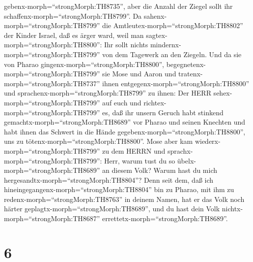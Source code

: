 gebenx-morph=``strongMorph:TH8735'', aber die Anzahl der Ziegel sollt
ihr schaffenx-morph=``strongMorph:TH8799''.  Da
sahenx-morph=``strongMorph:TH8799'' die
Amtleutex-morph=``strongMorph:TH8802'' der Kinder Israel, daß es ärger
ward, weil man sagtex-morph=``strongMorph:TH8800'': Ihr sollt nichts
mindernx-morph=``strongMorph:TH8799'' von dem Tagewerk an den Ziegeln.
 Und da sie von Pharao
gingenx-morph=``strongMorph:TH8800'',
begegnetenx-morph=``strongMorph:TH8799'' sie Mose und Aaron und
tratenx-morph=``strongMorph:TH8737'' ihnen
entgegenx-morph=``strongMorph:TH8800''  und
sprachenx-morph=``strongMorph:TH8799'' zu ihnen: Der HERR
sehex-morph=``strongMorph:TH8799'' auf euch und
richtex-morph=``strongMorph:TH8799'' es, daß ihr unsern Geruch habt
stinkend gemachtx-morph=``strongMorph:TH8689'' vor Pharao und seinen
Knechten und habt ihnen das Schwert in die Hände
gegebenx-morph=``strongMorph:TH8800'', uns zu
tötenx-morph=``strongMorph:TH8800''.  Mose aber kam
wiederx-morph=``strongMorph:TH8799'' zu dem HERRN und
sprachx-morph=``strongMorph:TH8799'': Herr, warum tust du so
übelx-morph=``strongMorph:TH8689'' an diesem Volk? Warum hast du mich
hergesandtx-morph=``strongMorph:TH8804''?  Denn seit dem,
daß ich hineingegangenx-morph=``strongMorph:TH8804'' bin zu Pharao, mit
ihm zu redenx-morph=``strongMorph:TH8763'' in deinem Namen, hat er das
Volk noch härter geplagtx-morph=``strongMorph:TH8689'', und du hast dein
Volk nichtx-morph=``strongMorph:TH8687''
errettetx-morph=``strongMorph:TH8689''.

\hypertarget{section-5}{%
\section{6}\label{section-5}}

